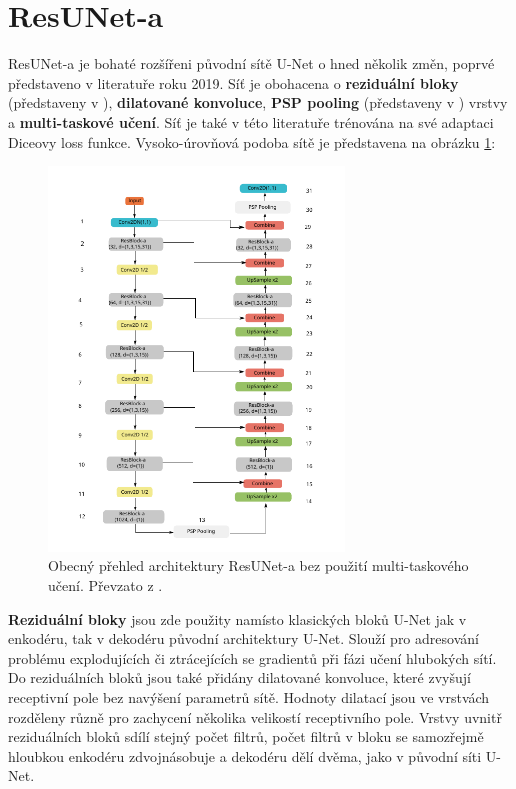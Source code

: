 \section{ResUNet-a}
\label{sec:Chapter25}

ResUNet-a je bohaté rozšířeni původní sítě U-Net o hned několik změn, poprvé představeno v literatuře \cite{resuneta} roku 2019. Síť je obohacena o \textbf{reziduální bloky} (představeny v \cite{residualblocks}), \textbf{dilatované konvoluce}, \textbf{PSP pooling} (představeny v \cite{psp}) vrstvy a \textbf{multi-taskové učení}. Síť je také v této literatuře trénována na své adaptaci Diceovy loss funkce. Vysoko-úrovňová podoba sítě je představena na obrázku \ref{fig:resuneta_overview}:

\begin{figure}[H]
\centering
\includegraphics[width=0.7\textwidth,keepaspectratio]{Figures/resuneta_overview.pdf}
\caption[Obecný přehled architektury ResUNet-a]{Obecný přehled architektury ResUNet-a bez použití multi-taskového učení. Převzato z \cite{resuneta}. }
\label{fig:resuneta_overview}
\end{figure}

\textbf{Reziduální bloky} jsou zde použity namísto klasických bloků U-Net jak v enkodéru, tak v dekodéru původní architektury U-Net. Slouží pro adresování problému explodujících či ztrácejících se gradientů při fázi učení hlubokých sítí. Do reziduálních bloků jsou také přidány dilatované konvoluce, které zvyšují receptivní pole bez navýšení parametrů sítě. Hodnoty dilatací jsou ve vrstvách rozděleny různě pro zachycení několika velikostí receptivního pole. Vrstvy uvnitř reziduálních bloků sdílí stejný počet filtrů, počet filtrů v bloku se samozřejmě hloubkou enkodéru zdvojnásobuje a dekodéru dělí dvěma, jako v původní síti U-Net.

